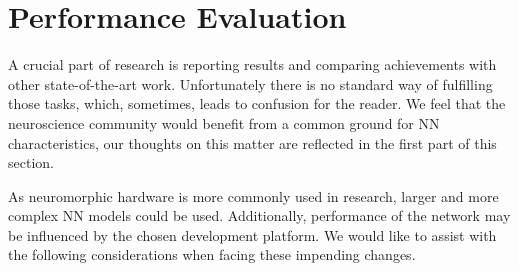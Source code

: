 \section{Performance Evaluation}
\label{sec:eval}

A crucial part of research is reporting results and comparing achievements with other state-of-the-art work. Unfortunately there is no standard way of fulfilling those tasks, which, sometimes, leads to confusion for the reader. We feel that the neuroscience community would benefit from a common ground for NN characteristics, our thoughts on this matter are reflected in the first part of this section.

As neuromorphic hardware is more commonly used in research, larger and more complex NN models could be used. Additionally, performance of the network may be influenced by the chosen development platform. We would like to assist with the following considerations when facing these impending changes.

